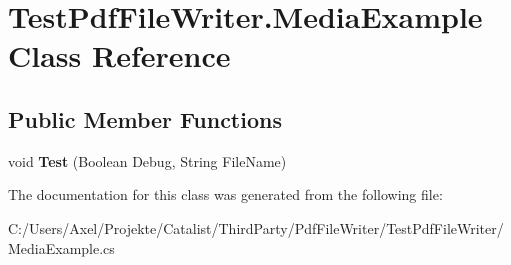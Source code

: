\hypertarget{class_test_pdf_file_writer_1_1_media_example}{}\section{Test\+Pdf\+File\+Writer.\+Media\+Example Class Reference}
\label{class_test_pdf_file_writer_1_1_media_example}
\subsection*{Public Member Functions}
\begin{DoxyCompactItemize}
\item 
void {\bfseries Test} (Boolean Debug, String File\+Name)\hypertarget{class_test_pdf_file_writer_1_1_media_example_a87f2c15058f76271cedce5d93ef6b7b0}{}\label{class_test_pdf_file_writer_1_1_media_example_a87f2c15058f76271cedce5d93ef6b7b0}

\end{DoxyCompactItemize}


The documentation for this class was generated from the following file\+:\begin{DoxyCompactItemize}
\item 
C\+:/\+Users/\+Axel/\+Projekte/\+Catalist/\+Third\+Party/\+Pdf\+File\+Writer/\+Test\+Pdf\+File\+Writer/Media\+Example.\+cs\end{DoxyCompactItemize}
